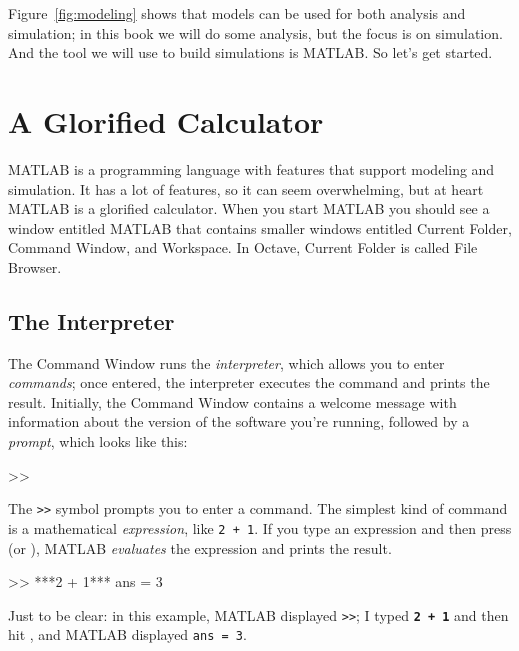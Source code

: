 Figure~\ref{fig:modeling} shows that models can be used for both analysis and simulation; in this book we will do some analysis, but the focus is on simulation.  And the tool we will use to build simulations is MATLAB.  So let's get started.


\section{A Glorified Calculator}
\label{calc}

MATLAB is a programming language with features that support modeling and simulation.  It has a lot of features, so it can seem overwhelming, but at heart MATLAB is a glorified calculator.  When you start MATLAB you should see a window entitled MATLAB that contains smaller windows entitled Current Folder, Command Window, and Workspace.
In Octave, Current Folder is called File Browser.


\subsection{The Interpreter}
The Command Window runs the \emph{interpreter}, which allows you
to enter \emph{commands}; once entered, the interpreter executes the command and prints the
result. 
Initially, the Command Window contains a welcome message with information
about the version of the software you're running, followed by a \emph{prompt}, which looks like this:

\begin{code}
>>
\end{code}

The \lstinline{>>} symbol prompts you to enter a command. 
The simplest kind of command is a mathematical \emph{expression},
like \lstinline{2 + 1}.
If you type an expression and then press  (or ), MATLAB
\emph{evaluates} the expression and prints the result.

\begin{code}
>> ***2 + 1***
ans = 3
\end{code}

Just to be clear: in this example, MATLAB displayed \lstinline{>>}; I
typed \textbf{\lstinline{2 + 1}} and then hit , and MATLAB displayed \lstinline{ans = 3}.



